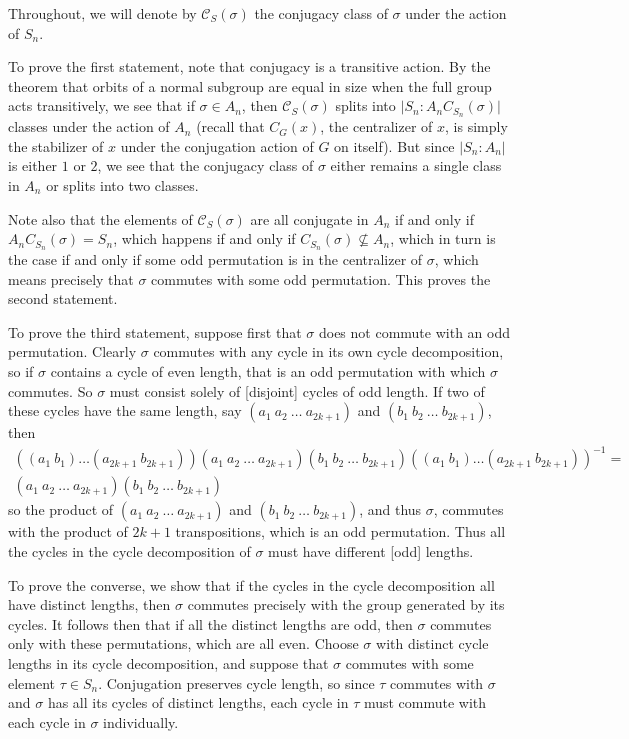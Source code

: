 \documentclass[12pt]{article}
\begin{document}
Throughout, we will denote by $\mathcal{C}_S(\sigma)$ the conjugacy class of $\sigma$ under the action of $S_n$.

To prove the first statement, note that conjugacy is a transitive action. By the theorem that orbits of a normal subgroup are equal in size when the full group acts transitively, we see that if $\sigma\in A_n$, then $\mathcal{C}_S(\sigma)$ splits into $\lvert S_n:A_n C_{S_n}(\sigma)\rvert$ classes under the action of $A_n$ (recall that $C_G(x)$, the centralizer of $x$, is simply the stabilizer of $x$ under the conjugation action of $G$ on itself). But since $\lvert S_n:A_n\rvert$ is either $1$ or $2$, we see that the conjugacy class of $\sigma$ either remains a single class in $A_n$ or splits into two classes.

Note also that the elements of $\mathcal{C}_S(\sigma)$ are all conjugate in $A_n$ if and only if $A_n C_{S_n}(\sigma)=S_n$, which happens if and only if $C_{S_n}(\sigma)\nsubseteq A_n$, which in turn is the case if and only if some odd permutation is in the centralizer of $\sigma$, which means precisely that $\sigma$ commutes with some odd permutation. This proves the second statement.

To prove the third statement, suppose first that $\sigma$ does not commute with an odd permutation. Clearly $\sigma$ commutes with any cycle in its own cycle decomposition, so if $\sigma$ contains a cycle of even length, that is an odd permutation with which $\sigma$ commutes. So $\sigma$ must consist solely of [disjoint] cycles of odd length. If two of these cycles have the same length, say $(a_1~a_2~\ldots~a_{2k+1})$ and $(b_1~b_2~\ldots~b_{2k+1})$, then
\begin{multline*}((a_1~b_1)\ldots(a_{2k+1}~b_{2k+1}))(a_1~a_2~\ldots~a_{2k+1})(b_1~b_2~\ldots~b_{2k+1})((a_1~b_1)\ldots(a_{2k+1}~b_{2k+1}))^{-1}=\\
(a_1~a_2~\ldots~a_{2k+1})(b_1~b_2~\ldots~b_{2k+1})
\end{multline*}
so the product of $(a_1~a_2~\ldots~a_{2k+1})$ and $(b_1~b_2~\ldots~b_{2k+1})$, and thus $\sigma$, commutes with the product of $2k+1$ transpositions, which is an odd permutation. Thus all the cycles in the cycle decomposition of $\sigma$ must have different [odd] lengths.

To prove the converse, we show that if the cycles in the cycle decomposition all have distinct lengths, then $\sigma$ commutes precisely with the group generated by its cycles. It follows then that if all the distinct lengths are odd, then $\sigma$ commutes only with these permutations, which are all even. Choose $\sigma$ with distinct cycle lengths in its cycle decomposition, and suppose that $\sigma$ commutes with some element $\tau\in S_n$. Conjugation preserves cycle length, so since $\tau$ commutes with $\sigma$ and $\sigma$ has all its cycles of distinct lengths, each cycle in $\tau$ must commute with each cycle in $\sigma$ individually.
\end{document}
